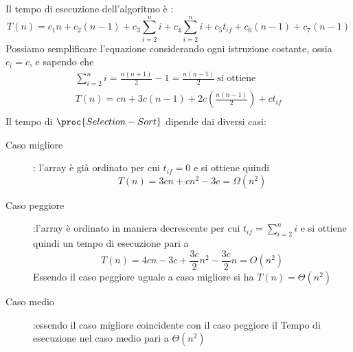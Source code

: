 Il tempo di esecuzione dell'algoritmo è :
\begin{equation*}
    T(n) = c_1n + c_2(n-1) + c_3 \sum _{i = 2} ^{n} i + c_4 \sum _{i = 2} ^ n i +
           c_5t_{if} + c_6(n-1) + c_7(n-1)
\end{equation*}
Possiamo semplificare l'equazione considerando ogni istruzione costante, ossia $c_i = c$, e sapendo che
\begin{align*}
  \sum _{i = 2} ^{n} i = \frac{n(n+1)}{2} - 1 = \frac{n(n-1)}{2} \ \text{si ottiene}\\
  T(n) = cn + 3c(n-1) + 2c(\frac{n(n-1)}{2}) + c t_{if} \\
\end{align*}
Il tempo di $\proc{Selection-Sort}$ dipende dai diversi casi:
\begin{description}
  \item[Caso migliore]: l'array è già ordinato per cui $t_{if} = 0$ e si ottiene quindi
        \begin{equation*}
          T(n) = 3cn + cn^2 - 3c = \Omega(n^2)
        \end{equation*}
  \item[Caso peggiore]:l'array è ordinato in maniera decrescente per cui $\displaystyle t_{if} = \sum _{i = 2} ^{n} i$
        e si ottiene quindi un tempo di esecuzione pari a
        \begin{equation*}
          T(n) = 4cn - 3c + \frac{3c}{2}n^2 - \frac{3c}{2}n = O(n^2)
        \end{equation*}
        Essendo il caso peggiore uguale a caso migliore si ha $T(n) = \Theta(n^2)$
  \item[Caso medio]:essendo il caso migliore coincidente con il caso peggiore il Tempo
        di esecuzione nel caso medio pari a $\Theta(n^2)$
\end{description}
